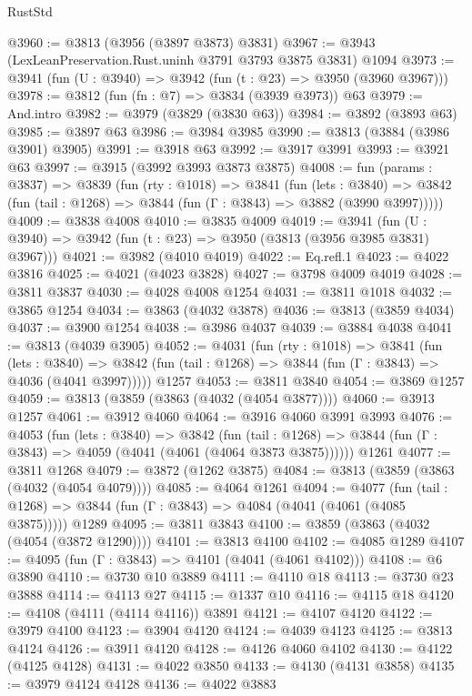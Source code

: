 \begin{lexlean}{RustStd}
\begin{coremodule}
@3960 := @3813 (@3956 (@3897 @3873) @3831)
@3967 := @3943 (LexLeanPreservation.Rust.uninh @3791 @3793 @3875 @3831) @1094
@3973 := @3941 (fun (U : @3940) => @3942 (fun (t : @23) => @3950 (@3960 @3967)))
@3978 := @3812 (fun (fn : @7) => @3834 (@3939 @3973)) @63
@3979 := And.intro
@3982 := @3979 (@3829 (@3830 @63))
@3984 := @3892 (@3893 @63)
@3985 := @3897 @63
@3986 := @3984 @3985
@3990 := @3813 (@3884 (@3986 @3901) @3905)
@3991 := @3918 @63
@3992 := @3917 @3991
@3993 := @3921 @63
@3997 := @3915 (@3992 @3993 @3873 @3875)
@4008 := fun (params : @3837) =>
  @3839
    (fun (rty : @1018) =>
    @3841
      (fun (lets : @3840) =>
      @3842 (fun (tail : @1268) => @3844 (fun (Γ : @3843) => @3882 (@3990 @3997)))))
@4009 := @3838 @4008
@4010 := @3835 @4009
@4019 := @3941 (fun (U : @3940) => @3942 (fun (t : @23) => @3950 (@3813 (@3956 @3985 @3831) @3967)))
@4021 := @3982 (@4010 @4019)
@4022 := Eq.refl.{1}
@4023 := @4022 @3816
@4025 := @4021 (@4023 @3828)
@4027 := @3798 @4009 @4019
@4028 := @3811 @3837
@4030 := @4028 @4008 @1254
@4031 := @3811 @1018
@4032 := @3865 @1254
@4034 := @3863 (@4032 @3878)
@4036 := @3813 (@3859 @4034)
@4037 := @3900 @1254
@4038 := @3986 @4037
@4039 := @3884 @4038
@4041 := @3813 (@4039 @3905)
@4052 := @4031
    (fun (rty : @1018) =>
    @3841
      (fun (lets : @3840) =>
      @3842 (fun (tail : @1268) => @3844 (fun (Γ : @3843) => @4036 (@4041 @3997)))))
    @1257
@4053 := @3811 @3840
@4054 := @3869 @1257
@4059 := @3813 (@3859 (@3863 (@4032 (@4054 @3877))))
@4060 := @3913 @1257
@4061 := @3912 @4060
@4064 := @3916 @4060 @3991 @3993
@4076 := @4053
    (fun (lets : @3840) =>
    @3842
      (fun (tail : @1268) => @3844 (fun (Γ : @3843) => @4059 (@4041 (@4061 (@4064 @3873 @3875))))))
    @1261
@4077 := @3811 @1268
@4079 := @3872 (@1262 @3875)
@4084 := @3813 (@3859 (@3863 (@4032 (@4054 @4079))))
@4085 := @4064 @1261
@4094 := @4077
    (fun (tail : @1268) => @3844 (fun (Γ : @3843) => @4084 (@4041 (@4061 (@4085 @3875)))))
    @1289
@4095 := @3811 @3843
@4100 := @3859 (@3863 (@4032 (@4054 (@3872 @1290))))
@4101 := @3813 @4100
@4102 := @4085 @1289
@4107 := @4095 (fun (Γ : @3843) => @4101 (@4041 (@4061 @4102)))
@4108 := @6 @3890
@4110 := @3730 @10 @3889
@4111 := @4110 @18
@4113 := @3730 @23 @3888
@4114 := @4113 @27
@4115 := @1337 @10
@4116 := @4115 @18
@4120 := @4108 (@4111 (@4114 @4116)) @3891
@4121 := @4107 @4120
@4122 := @3979 @4100
@4123 := @3904 @4120
@4124 := @4039 @4123
@4125 := @3813 @4124
@4126 := @3911 @4120
@4128 := @4126 @4060 @4102
@4130 := @4122 (@4125 @4128)
@4131 := @4022 @3850
@4133 := @4130 (@4131 @3858)
@4135 := @3979 @4124 @4128
@4136 := @4022 @3883

\end{coremodule}
\end{lexlean}
